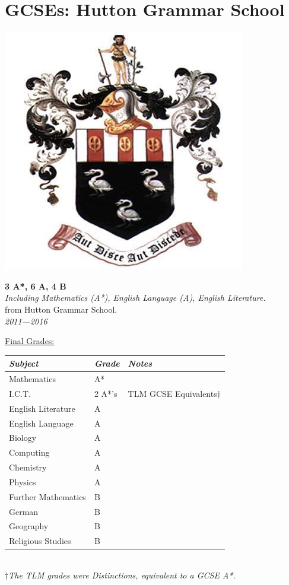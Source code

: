 \documentclass[9pt,a4paper]{article}
\begin{document}
\pagebreak


\section{GCSEs: Hutton Grammar School}

\begin{center}
	\includegraphics[height=0.15\textheight]{hgs.jpg}
\end{center}
\begin{center}
	\noindent\textbf{3 A*, 6 A, 4 B}\\
	\noindent\textit{Including Mathematics (A*), English Language (A), English Literature.}\\
	\noindent from Hutton Grammar School.\\
	\noindent\emph{2011---2016}
\end{center}

\underline{Final Grades:}\\
\begin{tabular}{p{5.2cm}|p{1.1cm}|p{4.5cm}}
	\emph{Subject}&\emph{Grade}&\emph{Notes}\\\hline\hline
	Mathematics & A* & \\
	I.C.T. & 2 A*'s &TLM GCSE Equivalents$\dagger$\\
	English Literature& A &\\
	English Language&A&\\
	Biology&A&\\
	Computing& A &\\
	Chemistry & A &\\
	Physics&A&\\
	Further Mathematics&B&\\
	German&B&\\
	Geography&B&\\
	Religious Studies&B&
\end{tabular}
\\\linebreak
\emph{$\dagger$The TLM grades were Distinctions, equivalent to a GCSE A*.}
\end{document}
